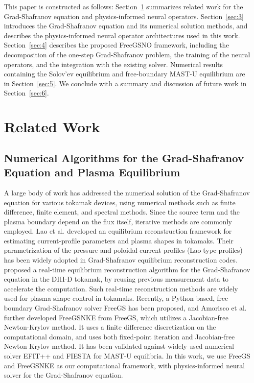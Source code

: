 This paper is constructed as follows: Section~\ref{sec:2} summarizes related work 
for the Grad-Shafranov equation and physics-informed neural operators.
Section~\ref{sec:3} introduces the Grad-Shafranov equation and its numerical solution methods,
and describes the physics-informed neural operator architectures used in this work.
Section~\ref{sec:4} describes the proposed FreeGSNO framework, including the decomposition of the one-step Grad-Shafranov problem, the training of the neural operators, 
and the integration with the existing solver.
Numerical results containing the Solov'ev equilibrium and free-boundary MAST-U equilibrium are 
in Section~\ref{sec:5}.
We conclude with a summary and discussion of future work in Section~\ref{sec:6}.

\section{Related Work} \label{sec:2}

\subsection{Numerical Algorithms for the Grad-Shafranov Equation and Plasma Equilibrium}

A large body of work \cite{Lao_1985,BLUM,RT-EFIT,EFIT++,LIUQE,HAN2021,SPECTRAL2,adaptiveGradShafranov,jeon,freegsnke} 
has addressed the numerical solution of the Grad-Shafranov equation for various tokamak devices,
using numerical methods such as finite difference, finite element, and spectral methods.
Since the source term and the plasma boundary depend on the flux itself, 
iterative methods are commonly employed.
Lao et al. \cite{Lao_1985} developed an equilibrium reconstruction framework 
for estimating current-profile parameters and plasma shapes in tokamaks.
Their parametrization of the pressure and 
poloidal-current profiles (Lao-type profiles) has been widely adopted in 
Grad-Shafranov equilibrium reconstruction codes.
\cite{RT-EFIT} proposed a real-time equilibrium reconstruction algorithm for the 
Grad-Shafranov equation in the DIII-D \cite{DIIID} tokamak, 
by reusing previous measurement data to accelerate the computation.
Such real-time reconstruction methods are widely used for plasma shape control in tokamaks.
Recently, a Python-based, free-boundary Grad-Shafranov solver 
FreeGS \cite{freegs} has been proposed,
and Amorisco et al. \cite{freegsnke} further developed FreeGSNKE from FreeGS,
which utilizes a Jacobian-free Newton-Krylov method.
It uses a finite difference discretization on the computational domain, and uses
both fixed-point iteration and Jacobian-free Newton-Krylov method.
It has been validated \cite{validation} against 
widely used numerical solver EFIT++ \cite{EFIT++} and FIESTA \cite{Fiesta} for MAST-U equilibria.
In this work, we use FreeGS and FreeGSNKE as our computational framework,
with physics-informed neural solver for the Grad-Shafranov equation.

